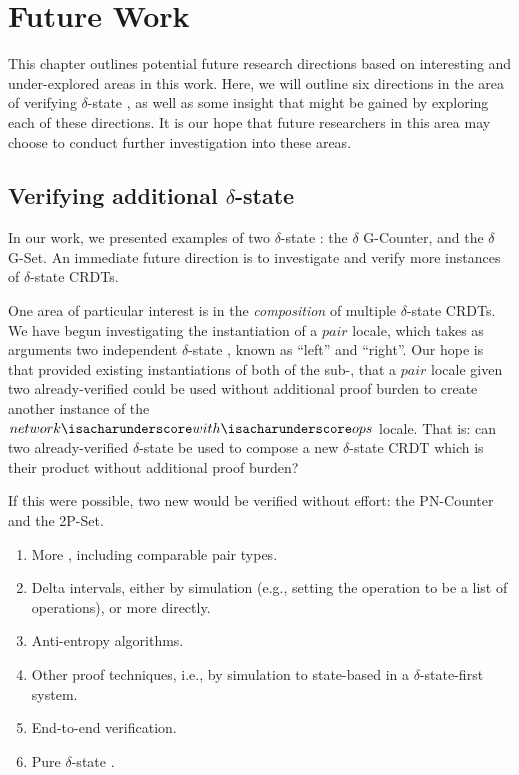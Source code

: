 \chapter{Future Work}
\label{chap:future-work}

This chapter outlines potential future research directions based on interesting
and under-explored areas in this work. Here, we will outline six directions in
the area of verifying $\delta$-state \CRDTs, as well as some insight that might
be gained by exploring each of these directions. It is our hope that future
researchers in this area may choose to conduct further investigation into these
areas.

\section{Verifying additional $\delta$-state \CRDTs}
In our work, we presented examples of two $\delta$-state \CRDTs: the $\delta$
G-Counter, and the $\delta$ G-Set. An immediate future direction is to
investigate and verify more instances of $\delta$-state CRDTs.

One area of particular interest is in the \emph{composition} of multiple
$\delta$-state CRDTs. We have begun investigating the instantiation of a $pair$
locale, which takes as arguments two independent $\delta$-state \CRDTs, known as
``left'' and ``right''. Our hope is that provided existing instantiations of
both of the sub-\CRDTs, that a $pair$ locale given two already-verified \CRDTs
could be used without additional proof burden to create another instance of the
$network{\isacharunderscore}with{\isacharunderscore}ops$ locale. That is: can
two already-verified $\delta$-state \CRDTs be used to compose a new
$\delta$-state CRDT which is their product without additional proof burden?

If this were possible, two new \CRDTs would be verified without effort: the
PN-Counter and the 2P-Set.

\begin{enumerate}
  \item More \CRDTs, including comparable pair types.
  \item Delta intervals, either by simulation (e.g., setting the operation to be
    a list of operations), or more directly.
  \item Anti-entropy algorithms.
  \item Other proof techniques, i.e., by simulation to state-based \CRDTs in a
    $\delta$-state-first system.
  \item End-to-end verification.
  \item Pure $\delta$-state \CRDTs.
\end{enumerate}
